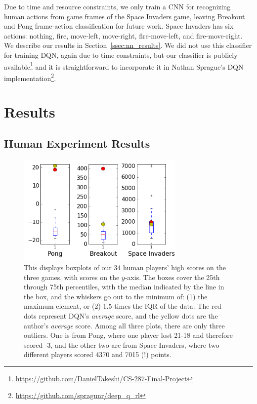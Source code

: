 \documentclass[letterpaper, 10 pt, conference]{ieeeconf}  %
\begin{document}
Due to time and resource constraints, we only train a CNN for recognizing human actions from game
frames of the Space Invaders game, leaving Breakout and Pong frame-action classification for future
work. Space Invaders has six actions: nothing, fire, move-left, move-right, fire-move-left, and
fire-move-right. We describe our results in Section~\ref{ssec:nn_results}. We did not use this
classifier for training DQN, again due to time constraints, but our classifier is publicly
available\footnote{\url{https://github.com/DanielTakeshi/CS-287-Final-Project}} and it is
straightforward to incorporate it in Nathan Sprague's DQN
implementation\footnote{\url{https://github.com/spragunr/deep_q_rl}}.


\section{Results}\label{sec:results}

\subsection{Human Experiment Results}\label{ssec:human_results}


\begin{figure}[t]
\centering
\includegraphics[width=3.2in]{fig_boxplots_human_results.png}
\caption{This displays boxplots of our 34 human players' high scores on the three games, with scores
on the $y$-axis. The boxes cover the 25th through 75th percentiles, with the median indicated by the
line in the box, and the whiskers go out to the minimum of: (1) the maximum element, or (2) 1.5
times the IQR of the data. The red dots represent DQN's \emph{average} score, and the yellow dots
are the author's \emph{average} score. Among all three plots, there are only three outliers. One is
from Pong, where one player lost 21-18 and therefore scored -3, and the other two are from Space
Invaders, where two different players scored 4370 and 7015 (!) points.}
\label{fig:human_results}
\end{figure}
\end{document}
